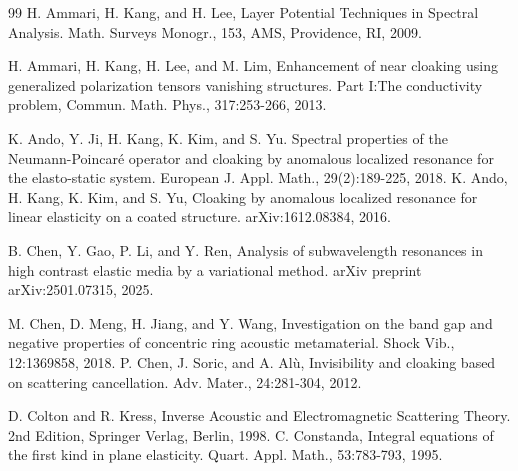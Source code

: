 \documentclass[10pt,reqno,oneside]{amsart}%
\theoremstyle{definition}
\theoremstyle{remark}
\numberwithin{equation}{section}
\numberwithin{equation}{section}
\begin{document}
\begin{thebibliography}{99}
H. Ammari, H. Kang, and H. Lee, Layer Potential Techniques in Spectral Analysis. Math. Surveys Monogr., 153, AMS, Providence, RI, 2009.

H. Ammari, H. Kang, H. Lee, and M. Lim, Enhancement of near cloaking using generalized
polarization tensors vanishing structures. Part I:The conductivity problem, Commun. Math. Phys., 317:253-266, 2013.

K. Ando, Y. Ji, H. Kang, K. Kim, and S. Yu. Spectral properties of the Neumann-Poincar\'e operator and cloaking by anomalous localized resonance for the elasto-static system. European J. Appl. Math., 29(2):189-225, 2018.
K. Ando, H. Kang, K. Kim, and S. Yu, Cloaking by anomalous localized resonance for linear elasticity on a coated structure. arXiv:1612.08384, 2016.

B. Chen, Y. Gao, P. Li, and Y. Ren, Analysis of subwavelength resonances in high contrast elastic media by a variational method. arXiv preprint arXiv:2501.07315, 2025.

M. Chen, D. Meng, H. Jiang, and Y. Wang, Investigation on the band gap and negative properties of concentric ring acoustic metamaterial. Shock Vib., 12:1369858, 2018.
P. Chen, J. Soric, and A. Al\`{u}, Invisibility and cloaking based on scattering cancellation. Adv. Mater., 24:281-304, 2012.

D. Colton and R. Kress, Inverse Acoustic and Electromagnetic Scattering Theory. 2nd Edition, Springer Verlag, Berlin, 1998.
C. Constanda, Integral equations of the first kind in plane elasticity. Quart. Appl. Math., 53:783-793, 1995.


\end{thebibliography}
\end{document}
